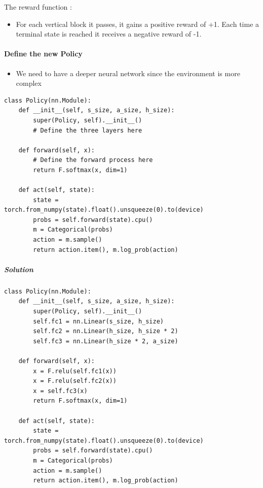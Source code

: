 \documentclass[11pt,a4paper]{article}
\begin{document}
The reward function :

\begin{itemize}
\tightlist
\item
  For each vertical block it passes, it gains a positive reward of +1. Each time a terminal state is reached it receives a negative reward of -1.
\end{itemize}

\paragraph{Define the new Policy}\label{define-the-new-policy}

\begin{itemize}
\tightlist
\item
  We need to have a deeper neural network since the environment is more complex
\end{itemize}

\begin{lstlisting}
class Policy(nn.Module):
    def __init__(self, s_size, a_size, h_size):
        super(Policy, self).__init__()
        # Define the three layers here

    def forward(self, x):
        # Define the forward process here
        return F.softmax(x, dim=1)

    def act(self, state):
        state = torch.from_numpy(state).float().unsqueeze(0).to(device)
        probs = self.forward(state).cpu()
        m = Categorical(probs)
        action = m.sample()
        return action.item(), m.log_prob(action)
\end{lstlisting}

\subparagraph{Solution}\label{solution-2}

\begin{lstlisting}
class Policy(nn.Module):
    def __init__(self, s_size, a_size, h_size):
        super(Policy, self).__init__()
        self.fc1 = nn.Linear(s_size, h_size)
        self.fc2 = nn.Linear(h_size, h_size * 2)
        self.fc3 = nn.Linear(h_size * 2, a_size)

    def forward(self, x):
        x = F.relu(self.fc1(x))
        x = F.relu(self.fc2(x))
        x = self.fc3(x)
        return F.softmax(x, dim=1)

    def act(self, state):
        state = torch.from_numpy(state).float().unsqueeze(0).to(device)
        probs = self.forward(state).cpu()
        m = Categorical(probs)
        action = m.sample()
        return action.item(), m.log_prob(action)
\end{lstlisting}
\end{document}
